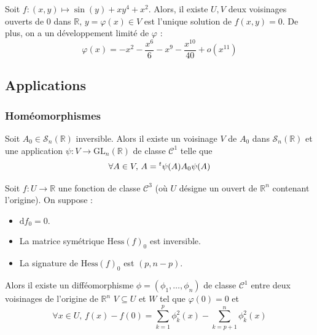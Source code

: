 
  \begin{example}
    Soit $f : (x,y) \mapsto \sin(y) + xy^4 + x^2$. Alors, il existe $U, V$ deux voisinages ouverts de $0$ dans $\mathbb{R}$, $y = \varphi(x) \in V$ est l'unique solution de $f(x,y) = 0$. De plus, on a un développement limité de $\varphi$ :
    \[ \varphi(x) = -x^2 - \frac{x^6}{6} - x^9 - \frac{x^{10}}{40} + o(x^{11}) \]
  \end{example}

  \subsection{Applications}

  \subsubsection{Homéomorphismes}


  \begin{lemma}
    Soit $A_0 \in \mathcal{S}_n(\mathbb{R})$ inversible. Alors il existe un voisinage $V$ de $A_0$ dans $\mathcal{S}_n(\mathbb{R})$ et une application $\psi : V \rightarrow \mathrm{GL}_n(\mathbb{R})$ de classe $\mathcal{C}^1$ telle que
    \[ \forall A \in V, \, A = \mathstrut ^t \psi(A) A_0 \psi(A) \]
  \end{lemma}


  \begin{lemma}
    Soit $f : U \rightarrow \mathbb{R}$ une fonction de classe $\mathcal{C}^3$ (où $U$ désigne un ouvert de $\mathbb{R}^n$ contenant l'origine). On suppose :
    \begin{itemize}
      \item $\mathrm{d} f_0 = 0$.
      \item La matrice symétrique $\mathrm{Hess} (f)_0$ est inversible.
      \item La signature de $\mathrm{Hess}(f)_0$ est $(p, n-p)$.
    \end{itemize}
    Alors il existe un difféomorphisme $\phi = (\phi_1, \dots, \phi_n)$ de classe $\mathcal{C}^1$ entre deux voisinages de l'origine de $\mathbb{R}^n$ $V \subseteq U$ et $W$ tel que $\varphi(0) = 0$ et
    \[ \forall x \in U, \, f(x) - f(0) = \sum_{k=1}^p \phi_k^2(x) - \sum_{k=p+1}^n \phi_k^2(x) \]
  \end{lemma}

